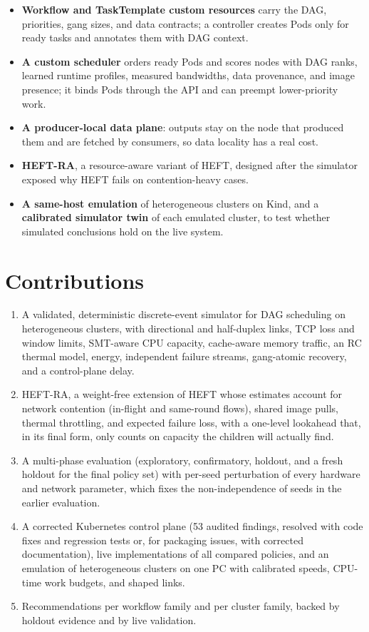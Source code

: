 \documentclass[12pt,a4paper]{report}
\begin{document}
\begin{itemize}
\item \textbf{Workflow and TaskTemplate custom resources} carry the DAG,
      priorities, gang sizes, and data contracts; a controller creates
      Pods only for ready tasks and annotates them with DAG context.
\item \textbf{A custom scheduler} orders ready Pods and scores nodes with
      DAG ranks, learned runtime profiles, measured bandwidths, data
      provenance, and image presence; it binds Pods through the API and
      can preempt lower-priority work.
\item \textbf{A producer-local data plane}: outputs stay on the node that
      produced them and are fetched by consumers, so data locality has a
      real cost.
\item \textbf{HEFT-RA}, a resource-aware variant of HEFT, designed after
      the simulator exposed why HEFT fails on contention-heavy cases.
\item \textbf{A same-host emulation} of heterogeneous clusters on Kind,
      and a \textbf{calibrated simulator twin} of each emulated cluster,
      to test whether simulated conclusions hold on the live system.
\end{itemize}

\section{Contributions}

\begin{enumerate}
\item A validated, deterministic discrete-event simulator for DAG
      scheduling on heterogeneous clusters, with directional and
      half-duplex links, TCP loss and window limits, SMT-aware CPU
      capacity, cache-aware memory traffic, an RC thermal model, energy,
      independent failure streams, gang-atomic recovery, and a
      control-plane delay.
\item HEFT-RA, a weight-free extension of HEFT whose estimates account
      for network contention (in-flight and same-round flows), shared image
      pulls, thermal throttling, and expected failure loss, with a
      one-level lookahead that, in its final form, only counts on capacity
      the children will actually find.
\item A multi-phase evaluation (exploratory, confirmatory, holdout, and a
      fresh holdout for the final policy set) with per-seed perturbation of
      every hardware and network parameter, which fixes the
      non-independence of seeds in the earlier evaluation.
\item A corrected Kubernetes control plane (53 audited findings, resolved
      with code fixes and regression tests or, for packaging issues, with
      corrected documentation), live implementations of all compared
      policies, and an emulation of heterogeneous clusters on one PC with
      calibrated speeds, CPU-time work budgets, and shaped links.
\item Recommendations per workflow family and per cluster family, backed
      by holdout evidence and by live validation.
\end{enumerate}
\end{document}
